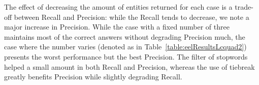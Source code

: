 The effect of decreasing the amount of entities returned for each case is a trade-off between 
Recall and Precision: while the Recall tends to decrease, we note a major increase in Precision. 
While the case with a fixed number of three maintains most of the correct answers without 
degrading Precision much, the case where the number varies (denoted as \dquotestt{+} in Table~\ref{table:eelResultsLcquad2}) 
presents the worst performance but the best Precision. The filter of stopwords helped a small 
amount in both Recall and Precision, whereas the use of tiebreak greatly benefits Precision 
while slightly degrading Recall.

\begin{table}[h!]
    \centering
\end{table}
